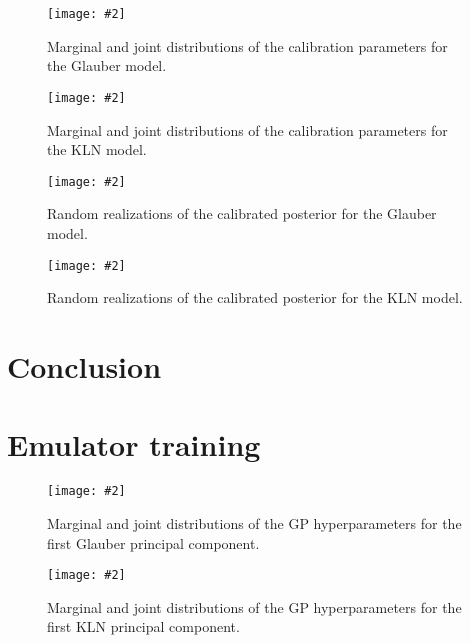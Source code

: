 \documentclass[aps, prc, reprint, amsmath]{revtex4-1}
\newcommand{\widefig}[3][t]{
  \begin{figure*}[#1]
    \texttt{[image: \#2]}
    \caption{\label{fig:#2}#3}
  \end{figure*}
}
\begin{document}
\widefig{calibration_posterior_glb}{
  Marginal and joint distributions of the calibration parameters for the Glauber model.
}

\widefig{calibration_posterior_kln}{
  Marginal and joint distributions of the calibration parameters for the KLN model.
}

\widefig{posterior_draws_glb}{
  Random realizations of the calibrated posterior for the Glauber model.
}

\widefig{posterior_draws_kln}{
  Random realizations of the calibrated posterior for the KLN model.
}



\section{Conclusion}



\appendix


\section{Emulator training}

\widefig{training_posterior_glb}{
  Marginal and joint distributions of the GP hyperparameters for the first Glauber principal component.
}

\widefig{training_posterior_kln}{
  Marginal and joint distributions of the GP hyperparameters for the first KLN principal component.
}




\end{document}
